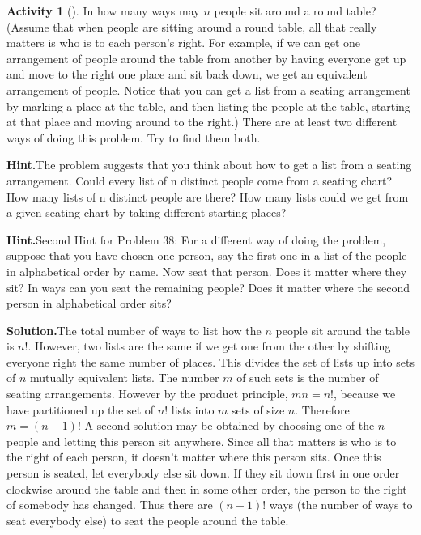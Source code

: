\documentclass[10pt,]{book}
\theoremstyle{plain}
\theoremstyle{definition}
\newtheorem{activity}[project]{Activity}
\numberwithin{equation}{chapter}
\begin{document}
\begin{activity}[]\label{roundtable}
In how many ways may \(n\) people sit around a round table? (Assume that when people are sitting around a round table, all that really matters is who is to each person's right. For example, if we can get one arrangement of people around the table from another by having everyone get up and move to the right one place and sit back down, we get an equivalent arrangement of people. Notice that you can get a list from a seating arrangement by marking a place at the table, and then listing the people at the table, starting at that place and moving around to the right.) There are at least two different ways of doing this problem. Try to find them both.%
\par\medskip\noindent%
\textbf{Hint.}\quad The problem suggests that you think about how to get a list from a seating arrangement. Could every list of n distinct people come from a seating chart? How many lists of n distinct people are there? How many lists could we get from a given seating chart by taking different starting places?\par\medskip\noindent%
\textbf{Hint.}\quad Second Hint for Problem 38: For a different way of doing the problem, suppose that you have chosen one person, say the first one in a list of the people in alphabetical order by name. Now seat that person. Does it matter where they sit? In ways can you seat the remaining people? Does it matter where the second person in alphabetical order sits?\par\medskip\noindent%
\textbf{Solution.}\quad The total number of ways to list how the \(n\) people sit around the table is \(n!\). However, two lists are the same if we get one from the other by shifting everyone right the same number of places. This divides the set of lists up into sets of \(n\) mutually equivalent lists. The number \(m\) of such sets is the number of seating arrangements. However by the product principle, \(mn=n!\), because we have partitioned up the set of \(n!\) lists into \(m\) sets of size \(n\). Therefore \(m=(n-1)!\) A second solution may be obtained by choosing one of the \(n\) people and letting this person sit anywhere. Since all that matters is who is to the right of each person, it doesn't matter where this person sits. Once this person is seated, let everybody else sit down. If they sit down first in one order clockwise around the table and then in some other order, the person to the right of somebody has changed. Thus there are \((n-1)!\) ways (the number of ways to seat everybody else) to seat the people around the table.%
\end{activity}
\end{document}
